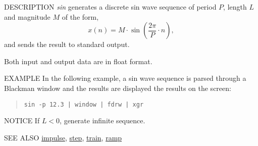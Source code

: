\begin{synopsis}
\item[sin] [ --l $L$ ] [ --p $P$ ] [ --m $M$ ]
\end{synopsis}

\begin{qsection}{DESCRIPTION}
{\em sin} generates a discrete sin wave sequence 
of period $P$, length $L$ and magnitude $M$ of the form, 
\begin{displaymath}
  x(n) = M \cdot \sin \left( \frac{2\pi}{P} \cdot n \right), 
\end{displaymath}
and sends the result to standard output.

Both input and output data are in float format.
\end{qsection}

\begin{options}
\end{options}

\begin{qsection}{EXAMPLE}
In the following example, a sin wave sequence is parsed through
a Blackman window and the results are displayed the results on the screen:
\begin{quote}
\verb!sin -p 12.3 | window | fdrw | xgr!
\end{quote}
\end{qsection}

\begin{qsection}{NOTICE}
If $L<0$, generate infinite sequence.
\end{qsection}

\begin{qsection}{SEE ALSO}
\hyperlink{impulse}{impulse},
\hyperlink{step}{step},
\hyperlink{train}{train},
\hyperlink{ramp}{ramp}
\end{qsection}
